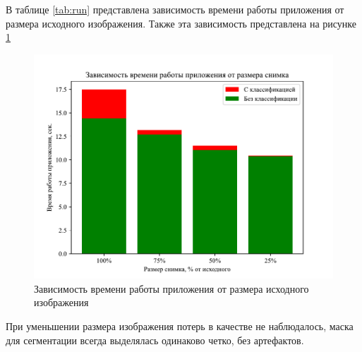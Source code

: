 В таблице \ref{tab:run} представлена зависимость времени работы приложения от размера исходного изображения. Также эта зависимость представлена на рисунке \ref{fig:run}

\begin{table}[H]
	\centering
	\caption{Время работы приложения в зависимости от размера исходного изображения}
	\label{tab:run}
\end{table}

\begin{figure}[H]
	\centering
	\includegraphics[width=\textwidth]{img/run.pdf}
	\caption{Зависимость времени работы приложения от размера исходного изображения}
	\label{fig:run}
\end{figure}

При уменьшении размера изображения потерь в качестве не наблюдалось, маска для сегментации всегда выделялась одинаково четко, без артефактов.

